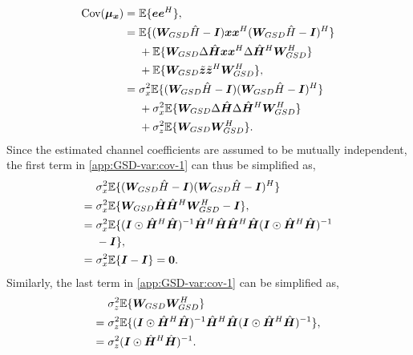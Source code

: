 \documentclass[journal]{IEEEtran}
\begin{document}
\begin{equation}
\begin{split}
\text{Cov}(\bm {\mu}_{\bm x}) = \hspace{0.3em} & \mathbb{E}\{\bm e \bm e^H\}, \\
=\hspace{0.3em} & \mathbb{E}\{({\bm W}_{GSD}\hat{H} - \bm I)\bm x \bm x^H ({\bm W}_{GSD}\hat{H} - \bm I)^H\} \\
& + \mathbb{E}\{ {\bm W}_{GSD}\Delta \hat{\bm H} \bm x \bm x^H \Delta \hat{\bm H}^H{\bm W}_{GSD}^H\} \\ 
& + \mathbb{E}\{ {\bm W}_{GSD}\tilde{\bm z}\tilde{\bm z}^H{\bm W}_{GSD}^H \}, \\
=\hspace{0.3em} & \sigma_x^2\mathbb{E}\{({\bm W}_{GSD}\hat{H} - \bm I)({\bm W}_{GSD}\hat{H} - \bm I)^H\} \\
& + \sigma_x^2\mathbb{E}\{{\bm W}_{GSD} \Delta \hat{\bm H} \Delta \hat{\bm H}^H{\bm W}_{GSD}^H\} \\ 
& + \sigma_z^2\mathbb{E}\{ {\bm W}_{GSD}{\bm W}_{GSD}^H \}. \\
\end{split}
\label{app:GSD-var:cov-1}
\end{equation}
Since the estimated channel coefficients are assumed to be mutually independent, the first term in \eqref{app:GSD-var:cov-1} can thus be simplified as,
\begin{equation}
\begin{split}
& \sigma_x^2\mathbb{E}\{({\boldsymbol{W}}_{GSD}\hat{H} - \boldsymbol{I})({\boldsymbol{W}}_{GSD}\hat{H} - \boldsymbol{I})^H\}\\
=\hspace{0.3em} & \sigma_x^2\mathbb{E}\{{\boldsymbol{W}}_{GSD}\hat{\boldsymbol{H}}\hat{\boldsymbol{H}}^H{\boldsymbol{W}}_{GSD}^H - \boldsymbol{I}\}, \\
=\hspace{0.3em} & \sigma_x^2\mathbb{E}\{ (\boldsymbol{I}\odot\hat{\boldsymbol{H}}^H \hat{\boldsymbol{H}})^{-1}\hat{\boldsymbol{H}}^H \hat{\boldsymbol{H}}\hat{\boldsymbol{H}}^H \hat{\boldsymbol{H}} (\boldsymbol{I}\odot\hat{\boldsymbol{H}}^H \hat{\boldsymbol{H}})^{-1} \\
& - \boldsymbol{I}\}, \\
=\hspace{0.3em} & \sigma_x^2\mathbb{E}\{ \boldsymbol{I} - \boldsymbol{I}\} = \boldsymbol{0}.
\end{split}
\end{equation}
Similarly, the last term in \eqref{app:GSD-var:cov-1} can be simplified as,
\begin{equation}
\begin{split}
 \hspace{0.3em}&\sigma_z^2\mathbb{E}\{ {\boldsymbol{W}}_{GSD}{\boldsymbol{W}}_{GSD}^H \} \\
=\hspace{0.3em} & \sigma_z^2\mathbb{E}\{(\boldsymbol{I}\odot\hat{\boldsymbol{H}}^H \hat{\boldsymbol{H}})^{-1}\hat{\boldsymbol{H}}^H \hat{\boldsymbol{H}} (\boldsymbol{I}\odot\hat{\boldsymbol{H}}^H \hat{\boldsymbol{H}})^{-1} \}, \\
=\hspace{0.3em} & \sigma_z^2(\boldsymbol{I}\odot \hat{\boldsymbol{H}}^H \hat{\boldsymbol{H}})^{-1}.
\end{split}
\end{equation}
\end{document}

